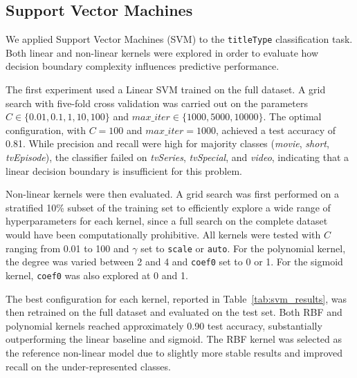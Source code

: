 \subsection{Support Vector Machines}
\label{subsec:svm}


We applied Support Vector Machines (SVM) to the \texttt{titleType} classification task.
Both linear and non-linear kernels were explored in order to evaluate how decision boundary complexity influences predictive performance.

The first experiment used a Linear SVM trained on the full dataset.  
A grid search with five-fold cross validation was carried out on the parameters 
$C \in \{0.01, 0.1, 1, 10, 100\}$ and $max\_iter \in \{1000, 5000, 10000\}$. 
The optimal configuration, with $C=100$ and $max\_iter=1000$, achieved a test accuracy of 0.81. 
While precision and recall were high for majority classes (\textit{movie}, \textit{short}, \textit{tvEpisode}), 
the classifier failed on \textit{tvSeries}, \textit{tvSpecial}, and \textit{video}, 
indicating that a linear decision boundary is insufficient for this problem.  

Non-linear kernels were then evaluated. 
A grid search was first performed on a stratified 10\% subset of the training set to efficiently explore a wide range of hyperparameters for each kernel, 
since a full search on the complete dataset would have been computationally prohibitive. 
All kernels were tested with $C$ ranging from 0.01 to 100 and $\gamma$ set to \texttt{scale} or \texttt{auto}.
For the polynomial kernel, the degree was varied between 2 and 4 and \texttt{coef0} set to 0 or 1.
For the sigmoid kernel, \texttt{coef0} was also explored at 0 and 1.

The best configuration for each kernel, reported in Table~\ref{tab:svm_results}, was then retrained on the full dataset and evaluated on the test set. 
Both RBF and polynomial kernels reached approximately 0.90 test accuracy, substantially outperforming the linear baseline and sigmoid. 
The RBF kernel was selected as the reference non-linear model due to slightly more stable results and improved recall on the under-represented classes.


